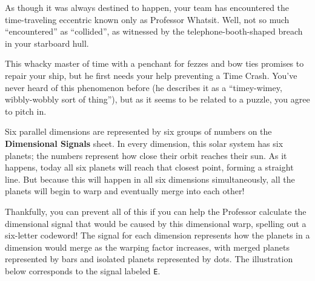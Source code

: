 As though it was always destined to happen, your team has encountered
the time-traveling eccentric known only as Professor Whatsit. Well, not
so much ``encountered'' as ``collided'', as witnessed by the 
telephone-booth-shaped breach in your starboard hull.

This whacky master of time with a penchant for fezzes and bow ties promises to
repair your ship, but he first needs your help preventing a
Time Crash. You've never heard of this phenomenon before (he describes it as a
``timey-wimey, wibbly-wobbly sort of thing''), but as it seems to be 
related to a puzzle, you agree to pitch in.

Six parallel dimensions are represented by six groups of numbers on
the \textbf{Dimensional Signals} sheet. In every dimension, this solar system
has six planets; the numbers represent how close their orbit reaches their sun.
As it happens, today all six planets will reach that closest
point, forming a straight line. But because this will happen
in all six dimensions simultaneously, all the planets will begin
to warp and eventually merge into each other!
%

Thankfully, you can prevent all of this if you can help the Professor
calculate the dimensional signal that would be caused by this dimensional
warp, spelling out a six-letter codeword!
The signal for each dimension represents how
the planets in a dimension would merge as the warping factor increases,
with merged planets represented by bars and isolated planets represented
by dots. The illustration below corresponds to the signal labeled \texttt{E}.

